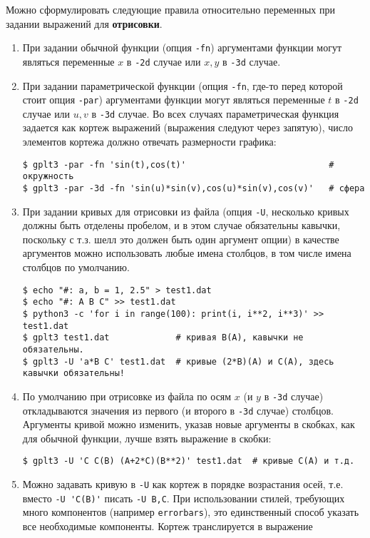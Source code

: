\documentclass[12pt]{article}
\begin{document}
Можно сформулировать следующие правила относительно переменных при задании выражений для {\bf отрисовки}.
\begin{enumerate}
\item При задании обычной функции (опция \verb'-fn') аргументами функции могут являться переменные $x$ в \verb'-2d' случае или $x, y$ в \verb'-3d' случае.
\item При задании параметрической функции (опция \verb'-fn', где-то перед которой стоит опция \verb'-par')
  аргументами функции могут являться переменные $t$ в \verb'-2d' случае или $u, v$ в \verb'-3d' случае. Во всех случаях параметрическая функция задается как
  кортеж выражений (выражения следуют через запятую), число элементов кортежа должно отвечать размерности графика:
\begin{verbatim}
$ gplt3 -par -fn 'sin(t),cos(t)'                            # окружность
$ gplt3 -par -3d -fn 'sin(u)*sin(v),cos(u)*sin(v),cos(v)'   # сфера
\end{verbatim}
\item При задании кривых для отрисовки из файла (опция \verb'-U', несколько кривых должны быть отделены пробелом, и в этом случае обязательны кавычки, поскольку с т.з.
  шелл это должен быть один аргумент опции) в качестве аргументов можно использовать любые имена столбцов, в том числе имена столбцов по умолчанию.
\begin{verbatim}
$ echo "#: a, b = 1, 2.5" > test1.dat 
$ echo "#: A B C" >> test1.dat 
$ python3 -c 'for i in range(100): print(i, i**2, i**3)' >> test1.dat
$ gplt3 test1.dat             # кривая B(A), кавычки не обязательны.
$ gplt3 -U 'a*B C' test1.dat  # кривые (2*B)(A) и C(A), здесь кавычки обязательны!
\end{verbatim}
\item По умолчанию при отрисовке из файла по осям $x$ (и $y$ в \verb'-3d' случае) откладываются значения из первого (и второго в \verb'-3d' случае) столбцов.
  Аргументы кривой можно изменить, указав новые аргументы в скобках, как для обычной функции, лучше взять выражение в скобки:
\begin{verbatim}
$ gplt3 -U 'С C(B) (A+2*C)(B**2)' test1.dat  # кривые C(A) и т.д.
\end{verbatim}
\item Можно задавать кривую в \verb'-U' как кортеж в порядке возрастания осей, т.е. вместо \verb|-U 'C(B)'| писать \verb'-U B,C'. При использовании
  стилей, требующих много компонентов (например \verb'errorbars'), это единственный способ указать все необходимые компоненты. Кортеж транслируется в выражение

\end{enumerate}
\end{document}
